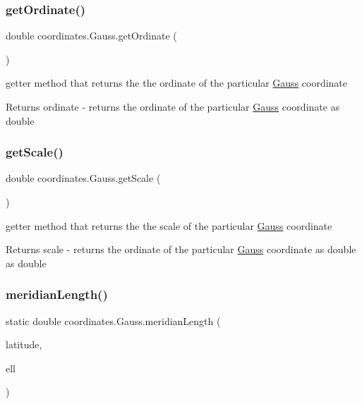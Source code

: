 \subsubsection{\texorpdfstring{get\+Ordinate()}{getOrdinate()}}
{\footnotesize\ttfamily double coordinates.\+Gauss.\+get\+Ordinate (\begin{DoxyParamCaption}{ }\end{DoxyParamCaption})}



getter method that returns the the ordinate of the particular \hyperlink{classcoordinates_1_1_gauss}{Gauss} coordinate 

\begin{DoxyReturn}{Returns}
ordinate -\/ returns the ordinate of the particular \hyperlink{classcoordinates_1_1_gauss}{Gauss} coordinate as double 
\end{DoxyReturn}
\mbox{\label{classcoordinates_1_1_gauss_ab0d10005ccb914af91c8afc28d2ed836}} 
\subsubsection{\texorpdfstring{get\+Scale()}{getScale()}}
{\footnotesize\ttfamily double coordinates.\+Gauss.\+get\+Scale (\begin{DoxyParamCaption}{ }\end{DoxyParamCaption})}



getter method that returns the the scale of the particular \hyperlink{classcoordinates_1_1_gauss}{Gauss} coordinate 

\begin{DoxyReturn}{Returns}
scale -\/ returns the ordinate of the particular \hyperlink{classcoordinates_1_1_gauss}{Gauss} coordinate as double as double 
\end{DoxyReturn}
\mbox{\label{classcoordinates_1_1_gauss_a622fa98764e45111e58a44c82f4dc5cd}} 
\subsubsection{\texorpdfstring{meridian\+Length()}{meridianLength()}}
{\footnotesize\ttfamily static double coordinates.\+Gauss.\+meridian\+Length (\begin{DoxyParamCaption}\item[{double}]{latitude,  }\item[{\hyperlink{classparams_1_1_ellipsoid_parms}{Ellipsoid\+Parms}}]{ell }\end{DoxyParamCaption})\hspace{0.3cm}{\ttfamily [static]}}

